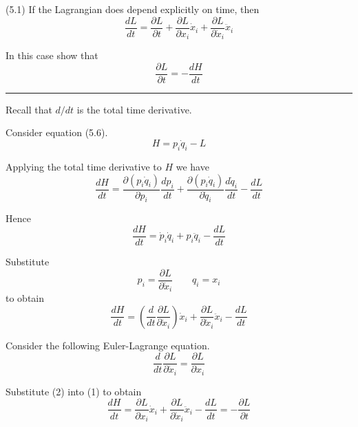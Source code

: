 \documentclass[12pt]{article}
\begin{document}
(5.1)
If the Lagrangian does depend explicitly on time,
then
\begin{equation*}
\frac{dL}{dt}=\frac{\partial L}{\partial t}
+\frac{\partial L}{\partial x_i}\dot x_i
+\frac{\partial L}{\partial\dot x_i}\ddot x_i
\tag{5.57}
\end{equation*}

In this case show that
\begin{equation*}
\frac{\partial L}{\partial t}=-\frac{dH}{dt}
\tag{5.58}
\end{equation*}

\bigskip
\hrule

\bigskip
Recall that $d/dt$ is the total time derivative.

\bigskip
Consider equation (5.6).
\begin{equation*}
H=p_i\dot q_i-L
\tag{5.6}
\end{equation*}

Applying the total time derivative to $H$ we have
\begin{equation*}
\frac{dH}{dt}
=\frac{\partial(p_i\dot q_i)}{\partial p_i}\frac{dp_i}{dt}
+\frac{\partial(p_i\dot q_i)}{\partial\dot q_i}\frac{d\dot q_i}{dt}
-\frac{dL}{dt}
\end{equation*}

Hence
\begin{equation*}
\frac{dH}{dt}
=\dot p_i\dot q_i+p_i\ddot q_i
-\frac{dL}{dt}
\end{equation*}

Substitute
\begin{equation*}
p_i=\frac{\partial L}{\partial\dot x_i}
\qquad
q_i=x_i
\end{equation*}
to obtain
\begin{equation*}
\frac{dH}{dt}
=\left(\frac{d}{dt}\frac{\partial L}{\partial\dot x_i}\right)\dot x_i
+\frac{\partial L}{\partial\dot x_i}\ddot x_i
-\frac{dL}{dt}
\tag{1}
\end{equation*}

Consider the following Euler-Lagrange equation.
\begin{equation*}
\frac{d}{dt}\frac{\partial L}{\partial\dot x_i}=\frac{\partial L}{\partial x_i}
\tag{2}
\end{equation*}

Substitute (2) into (1) to obtain
\begin{equation*}
\frac{dH}{dt}
=\frac{\partial L}{\partial x_i}\dot x_i
+\frac{\partial L}{\partial\dot x_i}\ddot x_i
-\frac{dL}{dt}
=-\frac{\partial L}{\partial t}
\end{equation*}
\end{document}
